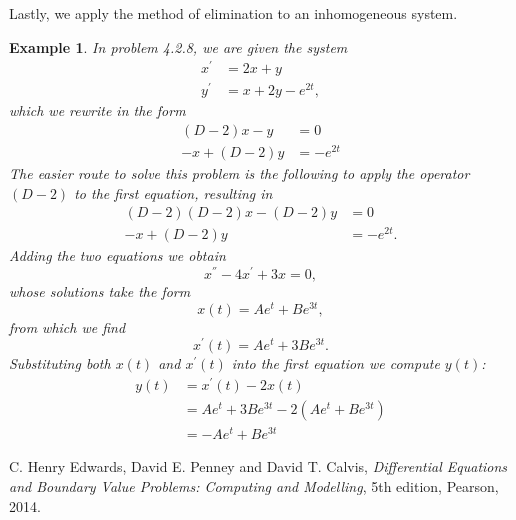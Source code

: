 \documentclass[11pt]{amsart}
\newtheorem{example}{Example}
\numberwithin{equation}{section}
\begin{document}
Lastly, we apply the method of elimination to an inhomogeneous system. 
\begin{example}
In problem 4.2.8, we are given the system
\begin{align*}
x^{'} & = 2x+y \\
y^{'} & = x+2y-e^{2t},
\end{align*}
which we rewrite in the form
\begin{align*}
(D-2)x - y & = 0 \\
-x + (D-2)y & = -e^{2t}
\end{align*}
The easier route to solve this problem is the following to apply the operator $(D-2)$ to the first equation, resulting in
\begin{align*}
(D-2)(D-2)x - (D-2)y & = 0 \\
-x + (D-2)y & = -e^{2t}.
\end{align*}
Adding the two equations we obtain
\begin{equation*}
x^{''}-4x^{'}+3x=0,
\end{equation*}
whose solutions take the form 
\begin{equation*}
x(t)=Ae^{t}+Be^{3t},
\end{equation*}
from which we find
\begin{equation*}
x^{'}(t) = Ae^{t}+3Be^{3t}.
\end{equation*}
Substituting both $x(t)$ and $x^{'}(t)$ into the first equation we compute $y(t)$:
\begin{align*}
y(t) & = x^{'}(t)-2x(t) \\
& = Ae^{t}+3Be^{3t} -2(Ae^{t}+Be^{3t}) \\
& = -Ae^{t}+Be^{3t}
\end{align*}
\end{example}
\begin{thebibliography}{0}

 C. Henry Edwards, David E. Penney and David T. Calvis, {\it Differential Equations and Boundary Value Problems: Computing and Modelling}, 5th edition, Pearson, 2014.

\end{thebibliography}
\end{document}
